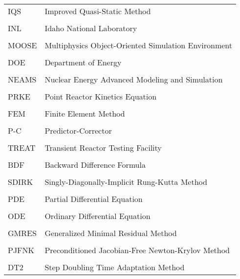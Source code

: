 \vspace{-0.5in}
	\begin{table}[htbp]
	    \begin{tabular}{@{}p{} p{}@{}}
		IQS 	& 	Improved Quasi-Static Method\\ & \\
		INL 	& 	Idaho National Laboratory\\ & \\
		MOOSE 	& 	Multiphysics Object-Oriented Simulation Environment\\ & \\
		DOE 	& 	Department of Energy\\ & \\  
		NEAMS 	& 	Nuclear Energy Advanced Modeling and Simulation\\ & \\  
		PRKE 	& 	Point Reactor Kinetics Equation\\ & \\  
		FEM 	& 	Finite Element Method\\ & \\  
		P-C 	& 	Predictor-Corrector\\ & \\  
		TREAT 	& 	Transient Reactor Testing Facility\\ & \\  
		BDF 	& 	Backward Difference Formula\\ & \\  
		SDIRK 	& 	Singly-Diagonally-Implicit Rung-Kutta Method\\ & \\  
		PDE 	& 	Partial Differential Equation\\ & \\  
		ODE 	& 	Ordinary Differential Equation\\ & \\  
		GMRES 	& 	Generalized Minimal Residual Method\\ & \\  
		PJFNK 	& 	Preconditioned Jacobian-Free Newton-Krylov Method\\ & \\  
		DT2 	& 	Step Doubling Time Adaptation Method
	    \end{tabular}%
	\end{table}

\pagebreak{}